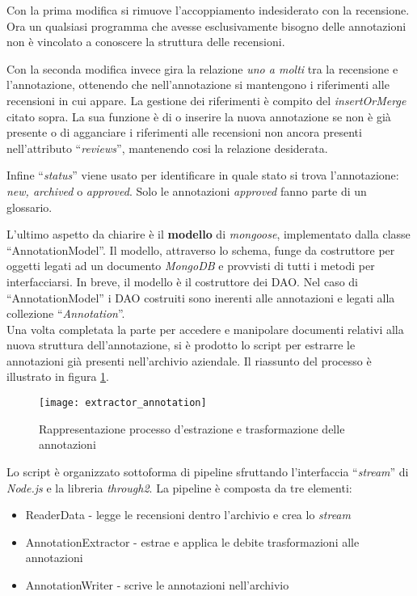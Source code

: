 Con la prima modifica si rimuove l'accoppiamento indesiderato con la recensione.
Ora un qualsiasi programma che avesse esclusivamente bisogno delle annotazioni
non è vincolato a conoscere la struttura delle recensioni.

Con la seconda modifica invece gira la relazione \textit{uno a molti} tra
la recensione e l'annotazione, ottenendo che nell'annotazione si mantengono i
riferimenti alle recensioni in cui appare. La gestione dei riferimenti è
compito del \textit{insertOrMerge} citato sopra. La sua funzione è di o inserire
la nuova annotazione se non è già presente o di agganciare i riferimenti alle
recensioni non ancora presenti nell'attributo ``\textit{reviews}'', mantenendo
cosi la relazione desiderata.

Infine ``\textit{status}'' viene usato per identificare in quale stato si trova
l'annotazione: \textit{new, archived} o \textit{approved}. Solo le annotazioni
\textit{approved} fanno parte di un glossario.

L'ultimo aspetto da chiarire è il \textbf{modello} di \textit{mongoose},
implementato dalla classe ``AnnotationModel''. Il modello, attraverso lo schema,
funge da costruttore per oggetti legati ad un documento \textit{MongoDB} e
provvisti di tutti i metodi per interfacciarsi. In breve, il modello è il
costruttore dei \gls{DAO}. Nel caso di ``AnnotationModel'' i \gls{DAO}
costruiti sono inerenti alle annotazioni e legati alla collezione
``\textit{Annotation}''. \\

Una volta completata la parte per accedere e manipolare documenti relativi
alla nuova struttura dell'annotazione, si è prodotto lo \gls{script} per
estrarre le annotazioni già presenti nell'archivio aziendale. Il riassunto del
processo è illustrato in figura \ref{fig:extractor_annotation}.

\begin{figure}[H]
\begin{center}
\texttt{[image: extractor\_annotation]}
\caption{
Rappresentazione processo d'estrazione e trasformazione delle annotazioni
}
\label{fig:extractor_annotation}
\end{center}
\end{figure}

Lo script è organizzato sottoforma di \gls{pipeline} sfruttando l'interfaccia
``\textit{stream}'' di \textit{Node.js} e la libreria \textit{through2}. La
\gls{pipeline} è composta da tre elementi:
\begin{itemize}
\item ReaderData - legge le recensioni dentro l'archivio e crea lo
\textit{stream}
\item AnnotationExtractor - estrae e applica le debite trasformazioni alle
annotazioni
\item AnnotationWriter - scrive le annotazioni nell'archivio
\end{itemize}

